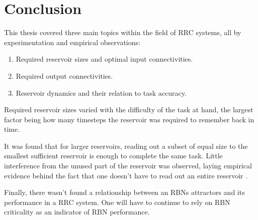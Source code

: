 \chapter{Conclusion}

This thesis covered three main topics within the field of RRC systems,
all by experimentation and empirical observations:

\begin{enumerate}
    \item Required reservoir sizes and optimal input connectivities.
    \item Required output connectivities.
    \item Reservoir dynamics and their relation to task accuracy.
\end{enumerate}

Required reservoir sizes varied with the difficulty of the task at hand,
the largest factor being how many timesteps the reservoir was required to remember back in time.

It was found that for larger reservoirs, reading out a subset of equal size to the smallest sufficient reservoir is enough to complete the same task.
Little interference from the unused part of the reservoir was observed,
laying empirical evidence behind the fact that one doesn't have to read out an entire reservoir .

Finally, there wasn't found a relationship between an RBNs attractors and its performance in a RRC system.
One will have to continue to rely on RBN criticality as an indicator of RBN performance.

